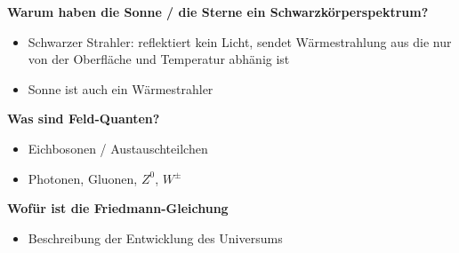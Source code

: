 \begin{frame}{}
  \textbf{Warum haben die Sonne / die Sterne ein Schwarzkörperspektrum?}
  \begin{itemize}
    \item Schwarzer Strahler: reflektiert kein Licht, sendet Wärmestrahlung aus die nur von der Oberfläche und Temperatur abhänig ist
    \item Sonne ist auch ein Wärmestrahler
  \end{itemize}
  \vspace{1em}
  \textbf{Was sind Feld-Quanten?}
  \begin{itemize}
    \item Eichbosonen / Austauschteilchen
    \item Photonen, Gluonen, $Z^0$, $W^\pm$
  \end{itemize}
  \vspace{1em}
  \textbf{Wofür ist die Friedmann-Gleichung}
  \begin{itemize}
    \item Beschreibung der Entwicklung des Universums
    \end{itemize}
\end{frame}

